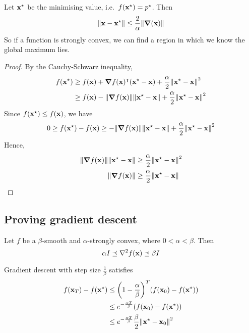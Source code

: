 \begin{claim}
	Let \(\vb x^\star\) be the minimising value, i.e.\ \(f(\vb x^\star) = p^\star\).
	Then
	\[
		\norm{\vb x - \vb x^\star} \leq \frac{2}{\alpha} \norm{\grad(\vb x)}
	\]
	So if a function is strongly convex, we can find a region in which we know the global maximum lies.
\end{claim}
\begin{proof}
	By the Cauchy-Schwarz inequality,
	\begin{align*}
		f(\vb x^\star) & \geq f(\vb x) + \grad{f(\vb x)}^\intercal (\vb x^\star - \vb x) + \frac{\alpha}{2}\norm{\vb x^\star - \vb x}^2  \\
		               & \geq f(\vb x) - \norm{\grad{f(\vb x)}} \norm{\vb x^\star - \vb x} + \frac{\alpha}{2}\norm{\vb x^\star - \vb x}^2
	\end{align*}
	Since \(f(\vb x^\star) \leq f(\vb x)\), we have
	\[
		0 \geq f(\vb x^\star) - f(\vb x) \geq - \norm{\grad{f(\vb x)}} \norm{\vb x^\star - \vb x} + \frac{\alpha}{2}\norm{\vb x^\star - \vb x}^2
	\]
	Hence,
	\begin{align*}
		\norm{\grad{f(\vb x)}} \norm{\vb x^\star - \vb x} & \geq \frac{\alpha}{2}\norm{\vb x^\star - \vb x}^2 \\
		\norm{\grad{f(\vb x)}}                            & \geq \frac{\alpha}{2}\norm{\vb x^\star - \vb x}   \\
	\end{align*}
\end{proof}

\subsection{Proving gradient descent}
Let \(f\) be a \(\beta\)-smooth and \(\alpha\)-strongly convex, where \(0 < \alpha < \beta\).
Then
\[
	\alpha I \preceq \laplacian{f(\vb x)} \preceq \beta I
\]
\begin{theorem}
	Gradient descent with step size \(\frac{1}{\beta}\) satisfies
	\begin{align*}
		f(\vb x_T) - f(\vb x^\star) & \leq \qty(1 - \frac{\alpha}{\beta})^T \qty(f(\vb x_0) - f(\vb x^\star)) \\&\leq e^{-\frac{\alpha T}{\beta}} \qty(f(\vb x_0) - f(\vb x^\star)) \\&\leq e^{-\frac{\alpha T}{\beta}} \frac{\beta}{2} \norm{\vb x^\star - \vb x_0}^2
	\end{align*}
\end{theorem}

